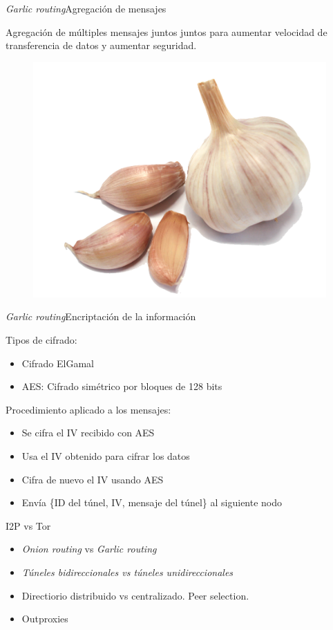 \documentclass[spanish]{beamer}
\begin{document}
 
 \begin{frame}{\textit{Garlic routing}}{Agregación de mensajes}
 
 
 Agregación de múltiples mensajes juntos juntos para aumentar velocidad de transferencia de datos y aumentar seguridad.
 
 \begin{figure}
\centering
\includegraphics[width=.35\textwidth]{img/garlic}
\end{figure}

 	
 \end{frame}
 
 \begin{frame}{\textit{Garlic routing}}{Encriptación de la información}
 
 Tipos de cifrado:
 \begin{itemize}
 	\item Cifrado ElGamal
 	\item AES: Cifrado simétrico por bloques de 128 bits
 \end{itemize}
 \vspace{1em}
 
 Procedimiento aplicado a los mensajes:
 	\begin{itemize}
 		\item Se cifra el IV recibido con AES
 		\item Usa el IV obtenido para cifrar los datos
 		\item Cifra de nuevo el IV usando AES
 		\item Envía \{ID del túnel, IV, mensaje del túnel\} al siguiente nodo
 	\end{itemize}

 
 \end{frame}
 
 
 
 \begin{frame}{I2P vs Tor}
 
 \begin{itemize}
	\item \textit{Onion routing} vs \textit{Garlic routing}
	\item \textit{Túneles bidireccionales vs túneles unidireccionales}
	\item Directiorio distribuido vs centralizado. Peer selection.
	\item Outproxies
\end{itemize}
   
\end{frame}
 
\end{document}
